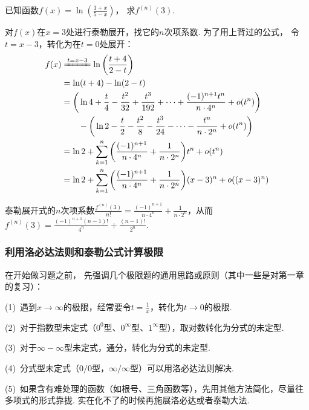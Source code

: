 \begin{example}
\label{ex:ch04-09}
已知函数$f(x)=\ln \left( \frac{1+x}{5-x} \right)$，
求$f^{(n)}(3)$.
\end{example}

\begin{solution}
对$f(x)$在$x=3$处进行泰勒展开，找它的$n$次项系数.
为了用上背过的公式，
令$t = x-3$，转化为在$t = 0$处展开：
    \begin{align*}
        f(x) &\xlongequal{t= x-3} \ln \left( \frac{t+4}{2-t} \right) \\
        &= \ln (t+4) - \ln(2-t) \\
        &= \bigg(\ln 4 + \frac{t}{4} - \frac{t^2}{32} + \frac{t^3}{192} + \cdots + \frac{(-1)^{n+1}t^n}{n \cdot 4^n} + o(t^n) \bigg)\\
        &~~~~~~ -\bigg( \ln 2 - \frac{t}{2} - \frac{t^2}{8} - \frac{t^3}{24} - \cdots - \frac{t^n}{n \cdot 2^n} +o(t^n)\bigg) \\
        &= \ln 2 + \sum_{k=1}^{n} \bigg( \frac{(-1)^{n+1}}{n \cdot 4^n} + \frac{1}{n \cdot 2^n} \bigg)t^n +o(t^n) \\
        &= \ln 2 + \sum_{k=1}^{n} \bigg( \frac{(-1)^{n+1}}{n \cdot 4^n} + \frac{1}{n \cdot 2^n} \bigg)(x-3)^n +o((x-3)^n)
        \nonumber
    \end{align*}

泰勒展开式的$n$次项系数$\frac{f^{(n)}(3)}{n!} = \frac{(-1)^{n+1}}{n \cdot 4^n} + \frac{1}{n \cdot 2^n} $，从而
$f^{(n)}(3) = \frac{(-1)^{n+1}(n-1)!}{4^n} + \frac{(n-1)!}{2^n}$.
\end{solution}

\subsubsection{利用洛必达法则和泰勒公式计算极限}\par
在开始做习题之前，
先强调几个极限题的通用思路或原则（其中一些是对第一章的复习）：

(1)~遇到$x \to \infty$的极限，经常要令$t = \frac{1}{x}$，转化为$t \to 0$的极限.\par
(2)~对于指数型未定式（$0^0$型、$0^\infty$型、$1^\infty$型），取对数转化为分式的未定型.\par
(3)~对于$\infty - \infty$型未定式，通分，转化为分式的未定型. \par
(4)~分式型未定式（$0/0$型，$\infty / \infty$型）可以用洛必达法则解决. \par
(5)~如果含有难处理的函数（如根号、三角函数等），先用其他方法简化，尽量往多项式的形式靠拢.
实在化不了的时候再施展洛必达或者泰勒大法.\par \vspace{1em}

